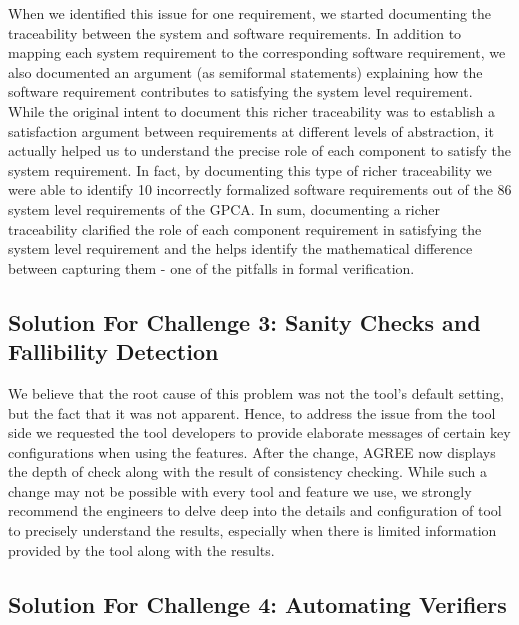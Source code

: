 When we identified this issue for one requirement, we started documenting the traceability between the system and software requirements. In addition to mapping each system requirement to the corresponding software requirement, we also documented an argument (as semiformal statements) explaining how the software requirement contributes to satisfying the system level requirement. While the original intent to document this richer traceability was to establish a satisfaction argument between requirements at different levels of abstraction, it actually helped us to understand the precise role of each component to satisfy the system requirement. In fact, by documenting this type of richer traceability we were able to identify 10 incorrectly formalized software requirements out of the 86 system level requirements of the GPCA. In sum, documenting a richer traceability clarified the role of each component requirement in satisfying the system level requirement and the helps identify the mathematical difference between capturing them - one of the pitfalls in formal verification.


\subsection {Solution For Challenge 3: Sanity Checks and Fallibility Detection}

We believe that the root cause of this problem was not the tool's default setting, but the fact that it was not apparent. Hence, to address the issue from the tool side we requested the tool developers to provide elaborate messages of certain key configurations when using the features. After the change, AGREE now displays the depth of check along with the result of consistency checking. While such a change may not be possible with every tool and feature we use, we strongly recommend the engineers to delve deep into the details and configuration of tool to precisely understand the results, especially when there is limited information provided by the tool along with the results.

\subsection {Solution For Challenge 4: Automating Verifiers}

